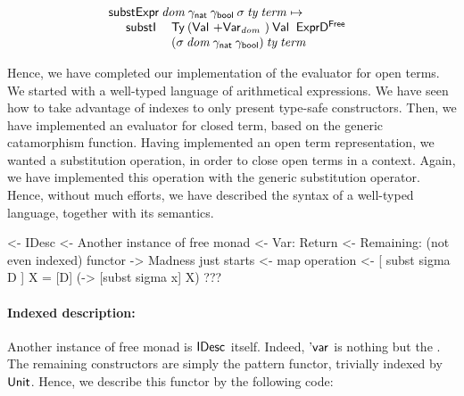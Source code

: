 \[\stk{
\substH\: \V{dom}\:
          \gammaNat\: \gammaBool\:
          \V{\sigma}\: 
          \V{ty}\: 
          \V{term} \mapsto  \\
\;\;\ \begin{array}{ll}
       \substI\: & \Ty\: 
                  (\SUM{\Val{}}{\Var{\V{dom}}{}})\: 
                  \Val{}\:
                  \HExprFreeD\:  \\
                &
                  (\V{\sigma}\: \V{dom}\: \gammaNat\: \gammaBool)\:
                  \V{ty}\:
                  \V{term}
      \end{array}
}\]

Hence, we have completed our implementation of the evaluator for open
terms. We started with a well-typed language of arithmetical
expressions. We have seen how to take advantage of indexes to only
present type-safe constructors. Then, we have implemented an evaluator
for closed term, based on the generic catamorphism function. Having
implemented an open term representation, we wanted a substitution
operation, in order to close open terms in a context. Again, we have
implemented this operation with the generic substitution
operator. Hence, without much efforts, we have described the syntax of
a well-typed language, together with its semantics.

\begin{wstructure}
<- IDesc
    <- Another instance of free monad
        <- Var: Return
        <- Remaining: (not even indexed) functor
    -> Madness just starts
        <- map operation
        <- [ subst sigma D ] X = [D] (\x -> [subst sigma x] X)
        ???
\end{wstructure}

\paragraph{Indexed description:}

Another instance of free monad is $\IDesc{\!}$ itself. Indeed,
$\DVar{\!}$ is nothing but the \return. The remaining constructors are
simply the pattern functor, trivially indexed by $\Unit$. Hence, we
describe this functor by the following code:

